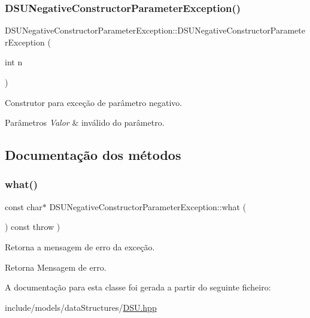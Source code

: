 \subsubsection{\texorpdfstring{D\+S\+U\+Negative\+Constructor\+Parameter\+Exception()}{DSUNegativeConstructorParameterException()}}
{\footnotesize\ttfamily D\+S\+U\+Negative\+Constructor\+Parameter\+Exception\+::\+D\+S\+U\+Negative\+Constructor\+Parameter\+Exception (\begin{DoxyParamCaption}\item[{int}]{n }\end{DoxyParamCaption})\hspace{0.3cm}{\ttfamily [inline]}}

Construtor para exceção de parâmetro negativo. 
\begin{DoxyParams}{Parâmetros}
{\em Valor} & inválido do parâmetro. \\
\hline
\end{DoxyParams}


\subsection{Documentação dos métodos}
\mbox{\label{classDSUNegativeConstructorParameterException_a16a3dcf8c0aeca0c1158ee18dd2a0c0f}} 
\subsubsection{\texorpdfstring{what()}{what()}}
{\footnotesize\ttfamily const char$\ast$ D\+S\+U\+Negative\+Constructor\+Parameter\+Exception\+::what (\begin{DoxyParamCaption}{ }\end{DoxyParamCaption}) const throw  ) \hspace{0.3cm}{\ttfamily [inline]}}

Retorna a mensagem de erro da exceção. \begin{DoxyReturn}{Retorna}
Mensagem de erro. 
\end{DoxyReturn}


A documentação para esta classe foi gerada a partir do seguinte ficheiro\+:\begin{DoxyCompactItemize}
\item 
include/models/data\+Structures/\hyperlink{DSU_8hpp}{D\+S\+U.\+hpp}\end{DoxyCompactItemize}

